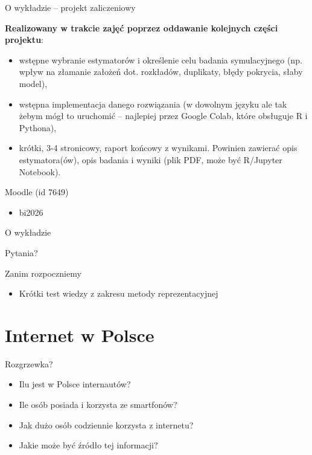 \documentclass[10pt,ignorenonframetext, aspectratio=169]{beamer}
\begin{document}
\begin{frame}{O wykładzie -- projekt zaliczeniowy}

\textbf{Realizowany w trakcie zajęć poprzez oddawanie kolejnych części projektu}:

    \begin{itemize}
        \item wstępne wybranie estymatorów i określenie celu badania symulacyjnego (np. wpływ na złamanie założeń dot. rozkładów, duplikaty, błędy pokrycia, słaby model),
        \item wstępna implementacja danego rozwiązania (w dowolnym języku ale tak żebym mógł to uruchomić -- najlepiej przez Google Colab, które obsługuje R i Pythona),
        \item krótki, 3-4 stronicowy, raport końcowy z wynikami. Powinien zawierać opis estymatora(ów), opis badania i wyniki (plik PDF, może być R/Jupyter Notebook).
    \end{itemize}
\end{frame}


\begin{frame}{Moodle (id 7649)}
    \begin{itemize}
        \item bi2026
    \end{itemize}
\end{frame}


\begin{frame}{O wykładzie}
    \begin{center}
        \Large
        Pytania?
    \end{center}
\end{frame}

\begin{frame}{Zanim rozpoczniemy}
    \begin{itemize}
        \item Krótki test wiedzy z zakresu metody reprezentacyjnej
    \end{itemize}
\end{frame}


\section{Internet w Polsce}


\begin{frame}{Rozgrzewka?}
    \begin{itemize}
        \item Ilu jest w Polsce internautów? 
        \item Ile osób posiada i korzysta ze smartfonów?
        \item Jak dużo osób codziennie korzysta z internetu?
        \item Jakie może być źródło tej informacji?
    \end{itemize}
\end{frame}
\end{document}
